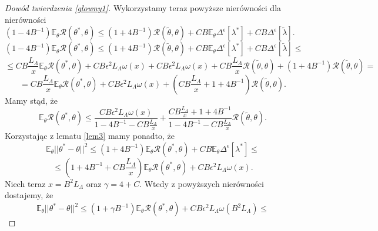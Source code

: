 \documentclass{article}
\begin{document}
\begin{proof}[Dowód twierdzenia \ref{glowny1}]
Wykorzystamy teraz powyższe nierówności dla nierówności $(1-4B^{-1})\mathbb{E}_{\theta}\mathcal{R}(\theta^*,\theta)\leq (1+4B^{-1})\mathcal{R}(\tilde{\theta},\theta)+CB\mathbb{E}_{\theta}\Delta^{\epsilon}[\lambda^*]+CB\Delta^{\epsilon}[\tilde{\lambda}]$.
\begin{displaymath}
(1-4B^{-1})\mathbb{E}_{\theta}\mathcal{R}(\theta^*,\theta)\leq (1+4B^{-1})\mathcal{R}(\tilde{\theta},\theta)+CB\mathbb{E}_{\theta}\Delta^{\epsilon}[\lambda^*]+CB\Delta^{\epsilon}[\tilde{\lambda}]\leq 
\end{displaymath}
\begin{displaymath}
\leq CB\frac{L_{\Lambda}}{x}\mathbb{E}_{\theta}\mathcal{R}(\theta^*,\theta)+CB\epsilon^2L_{\Lambda}\omega (x)+CB\epsilon^2L_{\Lambda}\omega (x)+CB\frac{L_{\Lambda}}{x}\mathcal{R}(\tilde{\theta},\theta)+(1+4B^{-1})\mathcal{R}(\tilde{\theta},\theta)=
\end{displaymath}
\begin{displaymath}
=CB\frac{L_{\Lambda}}{x}\mathbb{E}_{\theta}\mathcal{R}(\theta^*,\theta)+CB\epsilon^2L_{\Lambda}\omega (x)+\left(CB\frac{L_{\Lambda}}{x}+1+4B^{-1}\right)\mathcal{R}(\tilde{\theta},\theta).
\end{displaymath}
Mamy stąd, że 
\begin{displaymath}
\mathbb{E}_{\theta}\mathcal{R}(\theta^*,\theta)\leq \frac{CB\epsilon^2L_{\Lambda}\omega (x)}{1-4B^{-1}-CB\frac{L_{\Lambda}}{x}}+\frac{CB\frac{L_{\Lambda}}{x}+1+4B^{-1}}{1-4B^{-1}-CB\frac{L_{\Lambda}}{x}}\mathcal{R}(\tilde{\theta},\theta).
\end{displaymath}
Korzystając z lematu \ref{lem3} mamy ponadto, że
\begin{displaymath}
\mathbb{E}_{\theta}||\theta^*-\theta||^2\leq (1+4B^{-1})\mathbb{E}_{\theta}\mathcal{R}(\theta^*,\theta)+CB\mathbb{E}_{\theta}\Delta^{\epsilon}[\lambda^*]\leq
\end{displaymath}
\begin{displaymath}
\leq (1+4B^{-1}+CB\frac{L_{\Lambda}}{x})\mathbb{E}_{\theta}\mathcal{R}(\theta^*,\theta)+CB\epsilon^2L_{\Lambda}\omega (x).
\end{displaymath}
Niech teraz $x=B^2L_{\Lambda}$ oraz $\gamma=4+C$. Wtedy z powyższych nierówności dostajemy, że 
\begin{displaymath}
\mathbb{E}_{\theta}||\theta^*-\theta||^2\leq (1+\gamma B^{-1})\mathbb{E}_{\theta}\mathcal{R}(\theta^*,\theta)+CB\epsilon^2L_{\Lambda}\omega (B^2L_{\Lambda})\leq
\end{displaymath}
\begin{displaymath}

\end{displaymath}
\end{proof}
\end{document}
